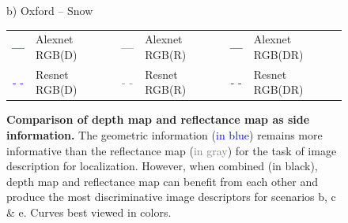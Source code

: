 \begin{figure}
\begin{minipage}{0.27\linewidth}
		b) Oxford -- Snow
	\end{minipage}
	
	\vspace{0.2cm}
	
	\begin{scriptsize}
	\begin{tabular}{c l c l c l }
		\textcolor{blue}{\textbf{\Large{---}}} & Alexnet RGB(D) & 
		\textcolor{gray}{\textbf{\Large{---}}} & Alexnet RGB(R) &
		\textbf{\Large{---}} & Alexnet RGB(DR) \\
		\textcolor{blue}{\Large{- -}} & Resnet RGB(D) & 
		\textcolor{gray}{\Large{- -}} & Resnet RGB(R) & 
		\Large{- -} & Resnet RGB(DR) \\
	\end{tabular}		
	\end{scriptsize}

	\caption[Comparison of depth map and reflectance map as side information]{\label{fig:ref_vs_depth} \textbf{Comparison of depth map and reflectance map as side information.} The geometric information (\textcolor{blue}{in blue}) remains more informative than the reflectance map (\textcolor{gray}{in gray}) for the task of image description for localization. However, when combined (in black), depth map and reflectance map can benefit from each other and produce the most discriminative image descriptors for scenarios b, c \& e. Curves best viewed in colors.}
\end{figure}